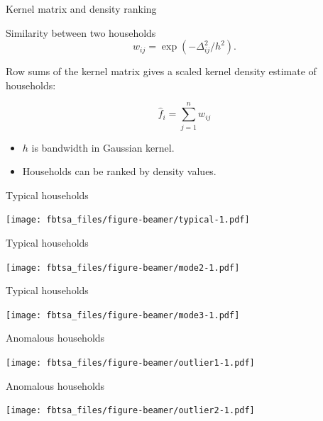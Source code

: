 \documentclass[14pt,ignorenonframetext,]{beamer}
\providecommand{\tightlist}{%
  \setlength{\itemsep}{0pt}\setlength{\parskip}{0pt}}
\begin{document}
\begin{frame}{Kernel matrix and density ranking}
\protect\hypertarget{kernel-matrix-and-density-ranking}{}

\begin{block}{Similarity between two households}
$$
  w_{ij} = \exp(-\Delta_{ij}^2/h^2).
$$
\end{block}\pause

Row sums of the kernel matrix gives a scaled kernel density estimate of
households:

\begin{block}{}
$$  \hat{f}_i = \sum_{j=1}^n w_{ij}$$
\end{block}

\begin{itemize}
\tightlist
\item
  \(h\) is bandwidth in Gaussian kernel.
\item
  Households can be ranked by density values.
\end{itemize}

\end{frame}

\begin{frame}{Typical households}
\protect\hypertarget{typical-households}{}

\texttt{[image: fbtsa\_files/figure-beamer/typical-1.pdf]}

\end{frame}

\begin{frame}{Typical households}
\protect\hypertarget{typical-households-1}{}

\texttt{[image: fbtsa\_files/figure-beamer/mode2-1.pdf]}

\end{frame}

\begin{frame}{Typical households}
\protect\hypertarget{typical-households-2}{}

\texttt{[image: fbtsa\_files/figure-beamer/mode3-1.pdf]}

\end{frame}

\begin{frame}{Anomalous households}
\protect\hypertarget{anomalous-households}{}

\texttt{[image: fbtsa\_files/figure-beamer/outlier1-1.pdf]}

\end{frame}

\begin{frame}{Anomalous households}
\protect\hypertarget{anomalous-households-1}{}

\texttt{[image: fbtsa\_files/figure-beamer/outlier2-1.pdf]}

\end{frame}
\end{document}
